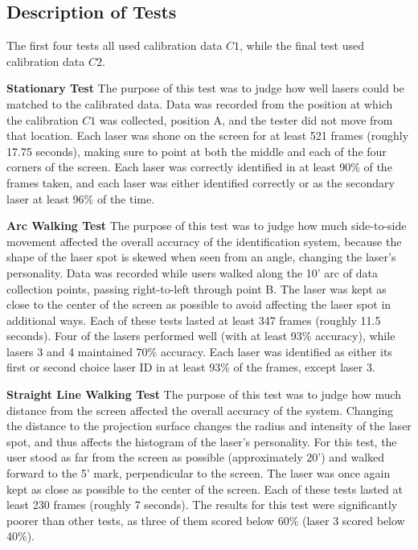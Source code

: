 \documentclass[review]{vgtc}                 %
\begin{document}
\subsection{Description of Tests}

The first four tests all used calibration data $C1$, while the final
test used calibration data $C2$.

\textbf{Stationary Test} The purpose of this test was to judge how
well lasers could be matched to the calibrated data. Data was recorded
from the position at which the calibration $C1$ was collected,
position A, and the tester did not move from that location. Each laser
was shone on the screen for at least 521 frames (roughly 17.75
seconds), making sure to point at both the middle and each of the four
corners of the screen. Each laser was correctly identified in at least
90\% of the frames taken, and each laser was either identified
correctly or as the secondary laser at least 96\% of the time.

\textbf{Arc Walking Test} The purpose of this test was to judge how
much side-to-side movement affected the overall accuracy of the
identification system, because the shape of the laser spot is skewed
when seen from an angle, changing the laser's personality. Data was
recorded while users walked along the 10' arc of data collection
points, passing right-to-left through point B. The laser was kept as
close to the center of the screen as possible to avoid affecting the
laser spot in additional ways. Each of these tests lasted at least 347
frames (roughly 11.5 seconds). Four of the lasers performed well (with
at least 93\% accuracy), while lasers 3 and 4 maintained 70\%
accuracy. Each laser was identified as either its first or second
choice laser ID in at least 93\% of the frames, except laser 3.

\textbf{Straight Line Walking Test} The purpose of this test was to
judge how much distance from the screen affected the overall accuracy
of the system. Changing the distance to the projection surface changes
the radius and intensity of the laser spot, and thus affects the
histogram of the laser's personality. For this test, the user stood as
far from the screen as possible (approximately 20') and walked forward
to the 5' mark, perpendicular to the screen. The laser was once again
kept as close as possible to the center of the screen. Each of these
tests lasted at least 230 frames (roughly 7 seconds). The results for
this test were significantly poorer than other tests, as three of them
scored below 60\% (laser 3 scored below 40\%).
\end{document}
